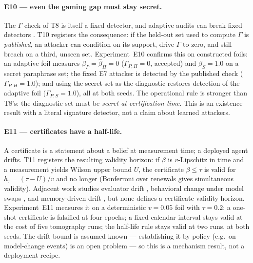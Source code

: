\documentclass[10pt,twocolumn]{article}
\begin{document}
\paragraph{E10 --- even the gaming gap must stay secret.}
The $\Gamma$ check of T8 is itself a fixed detector, and adaptive audits can
break fixed detectors \cite{soopal2026,duddu2026}. T10 registers the consequence:
if the held-out set used to compute $\Gamma$ is \emph{published}, an attacker can
condition on its support, drive $\Gamma$ to zero, and still breach on a third,
unseen set. Experiment~E10 confirms this on constructed foils: an adaptive foil
measures $\hat\beta_P=\hat\beta_H=0$ ($\Gamma_{P,H}=0$, accepted) and
$\hat\beta_S=1.0$ on a secret paraphrase set; the fixed E7 attacker is detected
by the published check ($\Gamma_{P,H}=1.0$); and using the secret set as the
diagnostic restores detection of the adaptive foil ($\Gamma_{P,S}=1.0$), all at
both seeds. The operational rule is stronger than T8's: the diagnostic set must
be \emph{secret at certification time}. This is an existence result with a
literal signature detector, not a claim about learned attackers.

\paragraph{E11 --- certificates have a half-life.}
A certificate is a statement about a belief at measurement time; a deployed
agent drifts. T11 registers the resulting validity horizon: if $\beta$ is
$v$-Lipschitz in time and a measurement yields Wilson upper bound $U$, the
certificate $\beta\le\tau$ is valid for $h_\tau=(\tau-U)/v$ and no longer
(Bonferroni over renewals gives simultaneous validity). Adjacent work studies
evaluator drift \cite{evaldrift2026}, behavioral change under model swaps
\cite{modeltransition2026}, and memory-driven drift \cite{memevo2026}, but none
defines a certificate validity horizon. Experiment~E11 measures it on a
deterministic $v=0.05$ foil with $\tau=0.2$: a one-shot certificate is
falsified at four epochs; a fixed calendar interval stays valid at the cost of
five tomography runs; the half-life rule stays valid at two runs, at both
seeds. The drift bound is assumed known --- establishing it by policy (e.g.\ on
model-change events) is an open problem --- so this is a mechanism result, not
a deployment recipe.
\end{document}
